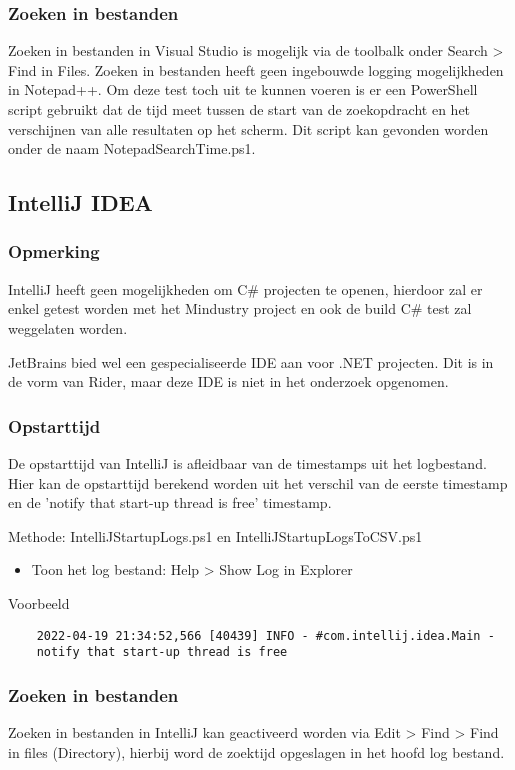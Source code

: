 \subsubsection{Zoeken in bestanden}
Zoeken in bestanden in Visual Studio is mogelijk via de toolbalk onder Search > Find in Files. Zoeken in bestanden heeft geen ingebouwde logging mogelijkheden in Notepad++. Om deze test toch uit te kunnen voeren is er een PowerShell script gebruikt dat de tijd meet tussen de start van de zoekopdracht en het verschijnen van alle resultaten op het scherm. Dit script kan gevonden worden onder de naam NotepadSearchTime.ps1.

\subsection{IntelliJ IDEA}
\subsubsection{Opmerking}
IntelliJ heeft geen mogelijkheden om C\# projecten te openen, hierdoor zal er enkel getest worden met het Mindustry project en ook de build C\# test zal weggelaten worden.

JetBrains bied wel een gespecialiseerde IDE aan voor .NET projecten. Dit is in de vorm van Rider, maar deze IDE is niet in het onderzoek opgenomen.

\subsubsection{Opstarttijd}
De opstarttijd van IntelliJ is afleidbaar van de timestamps uit het logbestand. Hier kan de opstarttijd berekend worden uit het verschil van de eerste timestamp en de 'notify that start-up thread is free' timestamp.

Methode: IntelliJStartupLogs.ps1 en IntelliJStartupLogsToCSV.ps1
\begin{itemize}
	\item Toon het log bestand: Help > Show Log in Explorer
\end{itemize}

Voorbeeld
\vspace{\verbatimOffset}
\begin{verbatim}
    2022-04-19 21:34:52,566 [40439] INFO - #com.intellij.idea.Main - 
    notify that start-up thread is free    
\end{verbatim}

\subsubsection{Zoeken in bestanden}
Zoeken in bestanden in IntelliJ kan geactiveerd worden via Edit > Find > Find in files (Directory), hierbij word de zoektijd opgeslagen in het hoofd log bestand.

